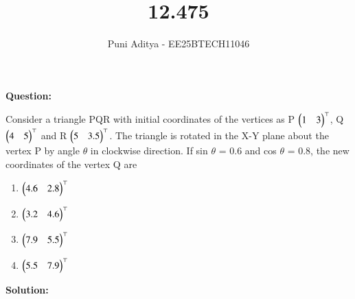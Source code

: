 \documentclass[journal]{IEEEtran}
\begin{document}
\title{12.475}
\author{Puni Aditya - EE25BTECH11046}
\maketitle

\textbf{Question:}

Consider a triangle PQR with initial coordinates of the vertices as P $\begin{pmatrix}1 & 3\end{pmatrix}^\top$, Q $\begin{pmatrix}4 & 5\end{pmatrix}^\top$ and R $\begin{pmatrix}5 & 3.5\end{pmatrix}^\top$. The triangle is rotated in the X-Y plane about the vertex P by angle $\theta$ in clockwise direction. If sin $\theta$ = 0.6 and cos $\theta$ = 0.8, the new coordinates of the vertex Q are
\begin{enumerate}
    \item $\begin{pmatrix}4.6 & 2.8\end{pmatrix}^\top$
    \item $\begin{pmatrix}3.2 & 4.6\end{pmatrix}^\top$
    \item $\begin{pmatrix}7.9 & 5.5\end{pmatrix}^\top$
    \item $\begin{pmatrix}5.5 & 7.9\end{pmatrix}^\top$
\end{enumerate}

\textbf{Solution:}
\end{document}
